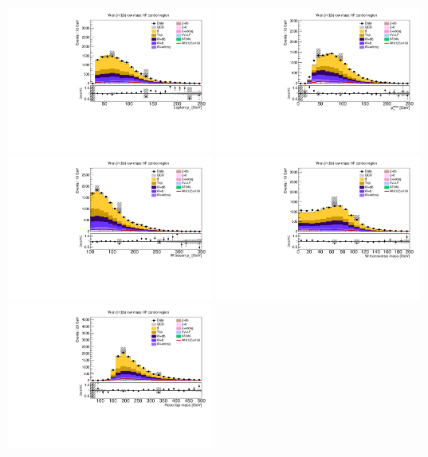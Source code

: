 \begin{figure}[tbp]
  \begin{center}
    \includegraphics[width=0.48\textwidth]{figures/wlnhbb2016/resolved/WenWHHeavyFlavorCRLowMass_lepton1Pt.pdf}
    \includegraphics[width=0.48\textwidth]{figures/wlnhbb2016/resolved/WenWHHeavyFlavorCRLowMass_pfmet.pdf}
    \includegraphics[width=0.48\textwidth]{figures/wlnhbb2016/resolved/WenWHHeavyFlavorCRLowMass_WpT.pdf}
    \includegraphics[width=0.48\textwidth]{figures/wlnhbb2016/resolved/WenWHHeavyFlavorCRLowMass_mTW.pdf}
    \includegraphics[width=0.48\textwidth]{figures/wlnhbb2016/resolved/WenWHHeavyFlavorCRLowMass_topMassLep1Met.pdf}

\end{center}
\end{figure}
